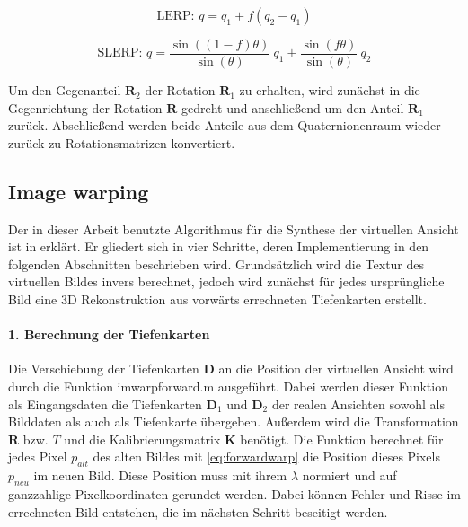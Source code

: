 \begin{equation}
\label{eq:LERP_eqo}
\text{LERP: } q = q_1+f(q_2-q_1)
\end{equation}

\begin{equation}
\label{eq:SLERP_eqo}
\text{SLERP: } q = \frac{\sin((1-f)\theta)}{\sin(\theta)} \: q_1+\frac{\sin(f\theta)}{\sin(\theta)} \: q_2
\end{equation}

Um den Gegenanteil $\boldsymbol{R}_2$ der Rotation $\boldsymbol{R}_1$ zu erhalten, wird zunächst in die Gegenrichtung der Rotation $\boldsymbol{R}$ gedreht und anschließend um den Anteil $\boldsymbol{R}_1$ zurück. Abschließend werden beide Anteile aus dem Quaternionenraum wieder zurück zu Rotationsmatrizen konvertiert.

\subsection{Image warping}
\label{Warp}

Der in dieser Arbeit benutzte Algorithmus für die Synthese der virtuellen Ansicht ist in \cite{Morvan} erklärt. Er gliedert sich in vier Schritte, deren Implementierung in den folgenden Abschnitten beschrieben wird. Grundsätzlich wird die Textur des virtuellen Bildes invers berechnet, jedoch wird zunächst für jedes ursprüngliche Bild eine 3D Rekonstruktion aus vorwärts errechneten Tiefenkarten erstellt.

\paragraph{1. Berechnung der Tiefenkarten}

Die Verschiebung der Tiefenkarten $\boldsymbol{D}$ an die Position der virtuellen Ansicht wird durch die Funktion \glqq imwarpforward.m\grqq{} ausgeführt. Dabei werden dieser Funktion als Eingangsdaten die Tiefenkarten $\boldsymbol{D}_1$ und $\boldsymbol{D}_2$ der realen Ansichten sowohl als Bilddaten als auch als Tiefenkarte übergeben. Außerdem wird die Transformation $\boldsymbol{R}$ bzw. $T$ und die Kalibrierungsmatrix $\boldsymbol{K}$ benötigt. Die Funktion berechnet für jedes Pixel $p_{alt}$ des alten Bildes mit \ref{eq:forwardwarp} die Position dieses Pixels $p_{neu}$ im neuen Bild. Diese Position muss mit ihrem $\lambda$ normiert und auf ganzzahlige Pixelkoordinaten gerundet werden. Dabei können Fehler und Risse im errechneten Bild entstehen, die im nächsten Schritt beseitigt werden.

